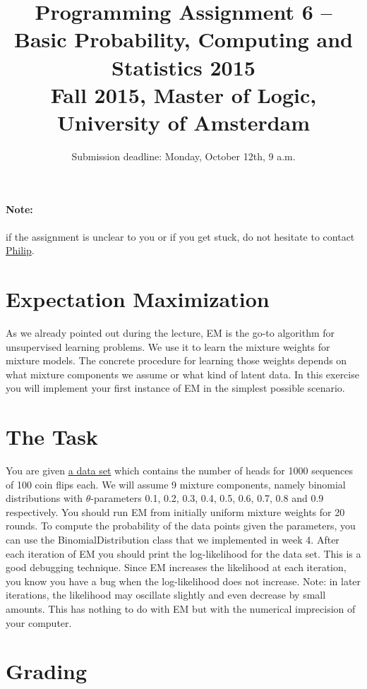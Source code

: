 \documentclass[11pt, leqno, a4paper]{article}
\title{Programming Assignment 6 -- Basic Probability, Computing and Statistics 2015 \\[2mm]
\large{Fall 2015, Master of Logic, University of Amsterdam}}
\author{}
\date{Submission deadline: Monday, October 12th, 9 a.m.}
\begin{document}
\maketitle

\paragraph{Note:} if the assignment is unclear to you or if you get stuck, do not hesitate to contact \href{mailto:P.Schulz@uva.nl}{Philip}.

\section{Expectation Maximization}

As we already pointed out during the lecture, EM is the go-to algorithm for unsupervised learning problems.
We use it to learn the mixture weights for mixture models. The concrete procedure for learning those
weights depends on what mixture components we assume or what kind of latent data. In this exercise
you will implement your first instance of EM in the simplest possible scenario. 

\section{The Task}

You are given 
\href{https://github.com/BasicProbability/BasicProbability.github.io/blob/master/Homework/Programming/Assignment6/coinFlips.txt}{a data set} which contains the number of heads for 1000 sequences of 100 coin flips each. 
We will assume 9 mixture components, namely binomial distributions with $ \theta $-parameters 0.1, 
0.2, 0.3, 0.4, 0.5, 0.6, 0.7, 0.8 and 0.9 respectively. You should run EM from initially uniform
mixture weights for 20 rounds. To compute the probability of the data points given the parameters,
you can use the BinomialDistribution class that we implemented in week 4. After each iteration
of EM you should print the log-likelihood for the data set. This is a good debugging technique.
Since EM increases the likelihood at each iteration, you know you have a bug when the
log-likelihood does not increase. Note: in later iterations, the likelihood may oscillate slightly
and even decrease by small amounts. This has nothing to do with EM but with the numerical imprecision
of your computer.

\section{Grading}
\end{document}
